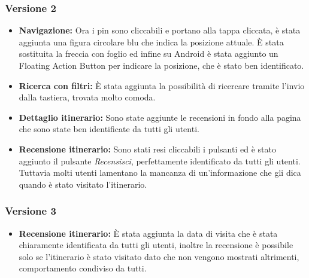 \subsubsection{Versione 2}

\begin{itemize}

\item \textbf{Navigazione:} Ora i pin sono cliccabili e portano alla tappa cliccata, è stata aggiunta una figura circolare blu che indica la posizione attuale. È stata sostituita la freccia con foglio ed infine su Android è stata aggiunto un Floating Action Button per indicare la posizione, che è stato ben identificato.

\item \textbf{Ricerca con filtri:} È stata aggiunta la possibilità di ricercare tramite l’invio dalla tastiera, trovata molto comoda.

\item \textbf{Dettaglio itinerario:} Sono state aggiunte le recensioni in fondo alla pagina che sono state ben identificate da tutti gli utenti.

\item \textbf{Recensione itinerario:} Sono stati resi cliccabili i pulsanti ed è stato aggiunto il pulsante \emph{Recensisci}, perfettamente identificato da tutti gli utenti. Tuttavia molti utenti lamentano la mancanza di un'informazione che gli dica quando è stato visitato l'itinerario.

\end{itemize}

\subsubsection{Versione 3}

\begin{itemize}

\item \textbf{Recensione itinerario:} È stata aggiunta la data di visita che è stata chiaramente identificata da tutti gli utenti, inoltre la recensione è possibile solo se l'itinerario è stato visitato dato che non vengono mostrati altrimenti, comportamento condiviso da tutti.

\end{itemize}




